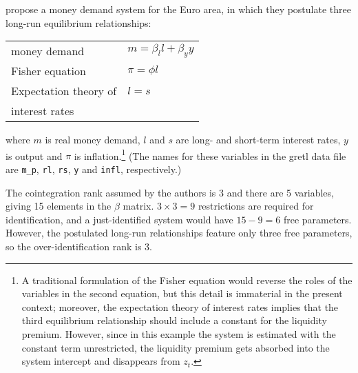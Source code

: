\cite{brand-cassola04} propose a money demand system for the Euro
area, in which they postulate three long-run equilibrium
relationships:
%
\begin{center}
\begin{tabular}{ll}
  money demand & $m = \beta_l l + \beta_y y$ \\
  Fisher equation & $\pi = \phi l$ \\
  Expectation theory of & $l = s$ \\ [-4pt]
  interest rates
\end{tabular}
\end{center}
%
where $m$ is real money demand, $l$ and $s$ are long- and short-term
interest rates, $y$ is output and $\pi$ is inflation.\footnote{A
  traditional formulation of the Fisher equation would reverse the
  roles of the variables in the second equation, but this detail is
  immaterial in the present context; moreover, the expectation theory
  of interest rates implies that the third equilibrium relationship
  should include a constant for the liquidity premium. However, since
  in this example the system is estimated with the constant term
  unrestricted, the liquidity premium gets absorbed into the system
  intercept and disappears from $z_t$.}  (The names for these
variables in the gretl data file are \verb|m_p|, \texttt{rl},
\texttt{rs}, \texttt{y} and \texttt{infl}, respectively.)

The cointegration rank assumed by the authors is 3 and there are 5
variables, giving 15 elements in the $\beta$ matrix.  $3 \times 3 = 9$
restrictions are required for identification, and a just-identified
system would have $15 - 9 = 6$ free parameters.  However, the
postulated long-run relationships feature only three free parameters,
so the over-identification rank is 3.

